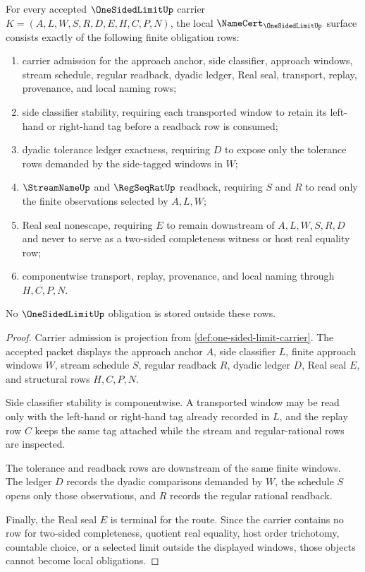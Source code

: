 \begin{theorem}\label{thm:one-sided-limit-namecert-obligations}
For every accepted $\OneSidedLimitUp$ carrier $K=(A,L,W,S,R,D,E,H,C,P,N)$, the local $\NameCert_{\OneSidedLimitUp}$ surface consists exactly of the following finite obligation rows:
\begin{enumerate}
\item carrier admission for the approach anchor, side classifier, approach windows, stream schedule, regular readback, dyadic ledger, Real seal, transport, replay, provenance, and local naming rows;
\item side classifier stability, requiring each transported window to retain its left-hand or right-hand tag before a readback row is consumed;
\item dyadic tolerance ledger exactness, requiring $D$ to expose only the tolerance rows demanded by the side-tagged windows in $W$;
\item $\StreamNameUp$ and $\RegSeqRatUp$ readback, requiring $S$ and $R$ to read only the finite observations selected by $A,L,W$;
\item Real seal nonescape, requiring $E$ to remain downstream of $A,L,W,S,R,D$ and never to serve as a two-sided completeness witness or host real equality row;
\item componentwise transport, replay, provenance, and local naming through $H,C,P,N$.
\end{enumerate}
No $\OneSidedLimitUp$ obligation is stored outside these rows.
\end{theorem}
\begin{proof}
Carrier admission is projection from \autoref{def:one-sided-limit-carrier}. The accepted packet displays the approach anchor $A$, side classifier $L$, finite approach windows $W$, stream schedule $S$, regular readback $R$, dyadic ledger $D$, Real seal $E$, and structural rows $H,C,P,N$.

Side classifier stability is componentwise. A transported window may be read only with the left-hand or right-hand tag already recorded in $L$, and the replay row $C$ keeps the same tag attached while the stream and regular-rational rows are inspected.

The tolerance and readback rows are downstream of the same finite windows. The ledger $D$ records the dyadic comparisons demanded by $W$, the schedule $S$ opens only those observations, and $R$ records the regular rational readback.

Finally, the Real seal $E$ is terminal for the route. Since the carrier contains no row for two-sided completeness, quotient real equality, host order trichotomy, countable choice, or a selected limit outside the displayed windows, those objects cannot become local obligations.
\end{proof}

